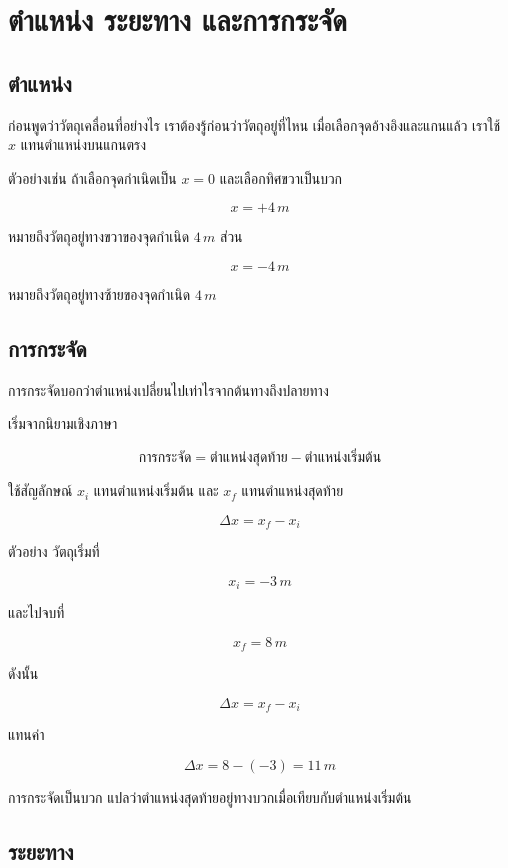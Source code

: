 \documentclass[12pt,a4paper]{report}
\begin{document}
\section{ตำแหน่ง ระยะทาง และการกระจัด}

\subsection{ตำแหน่ง}

ก่อนพูดว่าวัตถุเคลื่อนที่อย่างไร เราต้องรู้ก่อนว่าวัตถุอยู่ที่ไหน เมื่อเลือกจุดอ้างอิงและแกนแล้ว เราใช้ $x$ แทนตำแหน่งบนแกนตรง

ตัวอย่างเช่น ถ้าเลือกจุดกำเนิดเป็น $x=0$ และเลือกทิศขวาเป็นบวก

\[
x=+4\,\si{m}
\]

หมายถึงวัตถุอยู่ทางขวาของจุดกำเนิด $4\,\si{m}$ ส่วน

\[
x=-4\,\si{m}
\]

หมายถึงวัตถุอยู่ทางซ้ายของจุดกำเนิด $4\,\si{m}$

\subsection{การกระจัด}

การกระจัดบอกว่าตำแหน่งเปลี่ยนไปเท่าไรจากต้นทางถึงปลายทาง

เริ่มจากนิยามเชิงภาษา

\[
\text{การกระจัด} = \text{ตำแหน่งสุดท้าย} - \text{ตำแหน่งเริ่มต้น}
\]

ใช้สัญลักษณ์ $x_i$ แทนตำแหน่งเริ่มต้น และ $x_f$ แทนตำแหน่งสุดท้าย

\[
\Delta x = x_f-x_i
\]

\begin{examplebox}{ตัวอย่าง}
วัตถุเริ่มที่

\[
x_i=-3\,\si{m}
\]

และไปจบที่

\[
x_f=8\,\si{m}
\]

ดังนั้น

\[
\Delta x=x_f-x_i
\]

แทนค่า

\[
\Delta x=8-(-3)=11\,\si{m}
\]

การกระจัดเป็นบวก แปลว่าตำแหน่งสุดท้ายอยู่ทางบวกเมื่อเทียบกับตำแหน่งเริ่มต้น
\end{examplebox}

\subsection{ระยะทาง}
\end{document}
